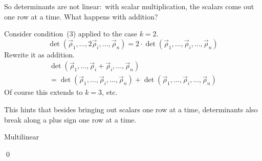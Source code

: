 \documentclass[10pt,t]{beamer}
\begin{document}
\begin{frame}
So determinants are not linear:~with scalar multiplication,
the scalars come out one row at a time.
What happens with addition?

Consider condition~(3) applied to the case   
$k=2$.
\begin{equation*}
  \det (\vec{\rho}_1,\dots,2\vec{\rho}_i,\dots,\vec{\rho}_n)
       = 2\cdot \det (\vec{\rho}_1,\dots,\vec{\rho}_i,\dots,\vec{\rho}_n)
\end{equation*}
Rewrite it as addition. 
\begin{multline*}
  \det (\vec{\rho}_1,\dots,\vec{\rho}_i+\vec{\rho}_i,\dots,\vec{\rho}_n) \\
       = \det (\vec{\rho}_1,\dots,\vec{\rho}_i,\dots,\vec{\rho}_n)
         +\det (\vec{\rho}_1,\dots,\vec{\rho}_i,\dots,\vec{\rho}_n)
\end{multline*}
Of course this extends to $k=3$, etc.

This hints that besides bringing out scalars one row at a time,
determinants also break along a plus sign one row at a time.
\end{frame}


\begin{frame}{Multilinear}



\pause
\pf
{}

\pause
{}
\end{frame}
\begin{frame}
\end{frame}
\begin{frame}
\qed
\end{frame}
\end{document}
